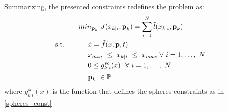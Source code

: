 Summarizing, the presented constraints redefines the problem as:
\begin{equation} \label{ourproblem_param_vinc}
	\begin{split}
			& min_{\textbf{p}_k}\ J({x}_{k|i},\textbf{p}_k) = \sum_{i=1}^{N}\tilde{l}({x}_{k|i},\textbf{p}_k) \\
			\textnormal{s.t.}\qquad
			&\ \ \ \ \dot{{x}}=\tilde{f}({x},\textbf{p},t) \\
			&\ \ \ \ {x}_{min}\ \leq\ x_{k|i}\ \leq\ {x}_{max}\  \forall\ i=1,\dots,\ N  \\
			&\ \ \ \ 0 \leq g^{sc}_{k|i}(x)\ \ \forall\ i=1,\dots,\ N \\
			&\ \ \ \ \textbf{p}_k\   \in \mathbb{P}\ \\
	\end{split}	
\end{equation}
where $g^{sc}_{k|i}(x)$ is the function that defines the spheres constraints as in \ref{spheres_const}

